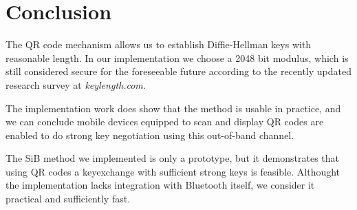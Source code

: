 \documentclass[conference, 11pt]{sty/IEEEtran}
\begin{document}
\section{Conclusion}
\label{sec:conclusion}


The QR code mechanism allows us to establish Diffie-Hellman keys with reasonable length. In our implementation we choose a 2048 bit modulus, which is still considered secure for the foreseeable future according to the recently updated research survey at \textit{keylength.com}\cite{keylengthdotcom}.

The implementation work does show that the method is usable in practice, and we can conclude mobile devices equipped to scan and display QR codes are enabled to do strong key negotiation using this out-of-band channel.

The SiB method we implemented is only a prototype, but it demonstrates that using QR codes a keyexchange with sufficient strong keys is feasible. Althought the implementation lacks integration with Bluetooth itself, we consider it practical and sufficiently fast.


\newpage
\end{document}

